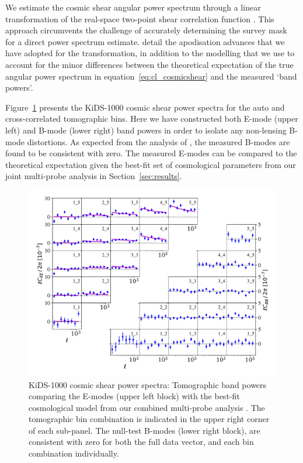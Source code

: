 We estimate the cosmic shear angular power spectrum through a linear transformation of the real-space two-point shear correlation function \citep{schneider/etal:2002}.  This approach circumvents the challenge of accurately determining the survey mask for a direct power spectrum estimate.  \citet{joachimi/etal:inprep} detail the apodisation advances that we have adopted for the transformation, in addition to the modelling that we use to account for the minor differences between the theoretical expectation of the true angular power spectrum in equation~\ref{eq:cl_cosmicshear} and the measured `band powers'.    
 
Figure~\ref{fig:Pkk} presents the \citet{asgari/etal:inprep} KiDS-1000 cosmic shear power spectra for the auto and cross-correlated tomographic bins.   Here we have constructed both E-mode (upper left) and B-mode (lower right) band powers in order to isolate any non-lensing B-mode distortions.     As expected from the analysis of \citet{giblin/etal:inprep}, the measured B-modes are found to be consistent with zero.   The measured E-modes can be compared to the theoretical expectation given the best-fit set of cosmological parameters from our joint multi-probe analysis in Section~\ref{sec:results}.



\begin{figure}
        \includegraphics[width=\textwidth]{Data_Plots/Pkk/Pkk_K1000_2Dbins_v2_goldclasses_Flag_SOM_Fid_A.pdf}
        \caption{KiDS-1000 cosmic shear power spectra:  Tomographic
          band powers comparing the E-modes (upper left block) with the best-fit
          cosmological model from our combined multi-probe analysis
          .  The tomographic
        bin combination is indicated in the upper right corner of each
      sub-panel.  The null-test B-modes (lower right block), are
      consistent with zero for both the full data vector, and each
     bin combination individually.}
        \label{fig:Pkk}
\end{figure}


